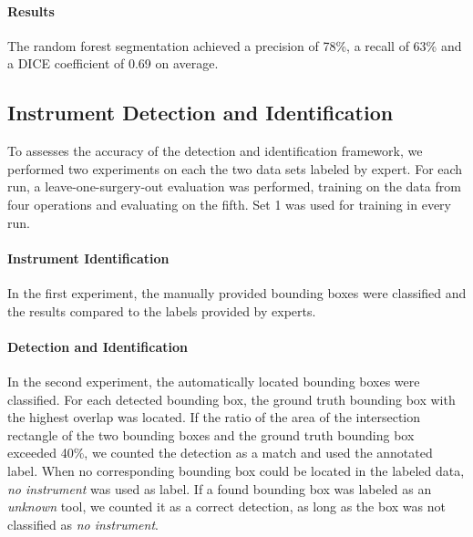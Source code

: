 \documentclass{llncs}
\begin{document}
\paragraph{Results}
The random forest segmentation achieved a precision of 78\%, a recall of 63\% and a DICE coefficient of 0.69 on average.
\subsection{Instrument Detection and Identification}
To assesses the accuracy of the detection and identification framework, we performed two experiments on each the two data sets labeled by expert.
For each run, a leave-one-surgery-out evaluation was performed, training on the data from four operations and evaluating on the fifth.
Set 1 was used for training in every run.

\paragraph{Instrument Identification}
In the first experiment, the manually provided bounding boxes were classified and the results compared to the labels provided by experts.

\paragraph{Detection and Identification}
In the second experiment, the automatically located bounding boxes were classified.
For each detected bounding box, the ground truth bounding box with the highest overlap was located.
If the ratio of the area of the intersection rectangle of the two bounding boxes and the ground truth bounding box exceeded 40\%, we counted the detection as a match and used the annotated label.
When no corresponding bounding box could be located in the labeled data, \textit{no instrument} was used as label.
If a found bounding box was labeled as an \textit{unknown} tool, we counted it as a correct detection, as long as the box was not classified as \textit{no instrument}.
\end{document}
